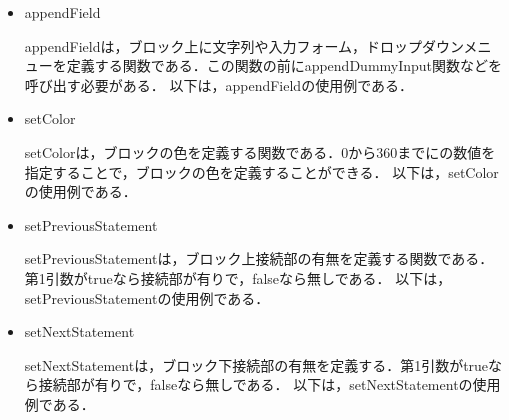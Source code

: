 \documentclass{risepaper}
\begin{document}
\begin{itemize}

\item appendField

appendFieldは，ブロック上に文字列や入力フォーム，ドロップダウンメニューを定義する関数である．この関数の前にappendDummyInput関数などを呼び出す必要がある．
以下は，appendFieldの使用例である．


\item setColor

setColorは，ブロックの色を定義する関数である．0から360までにの数値を指定することで，ブロックの色を定義することができる．
以下は，setColorの使用例である．


\item setPreviousStatement

setPreviousStatementは，ブロック上接続部の有無を定義する関数である．第1引数がtrueなら接続部が有りで，falseなら無しである．
以下は，setPreviousStatementの使用例である．


\item setNextStatement

setNextStatementは，ブロック下接続部の有無を定義する．第1引数がtrueなら接続部が有りで，falseなら無しである．
以下は，setNextStatementの使用例である．



\end{itemize}
\end{document}
